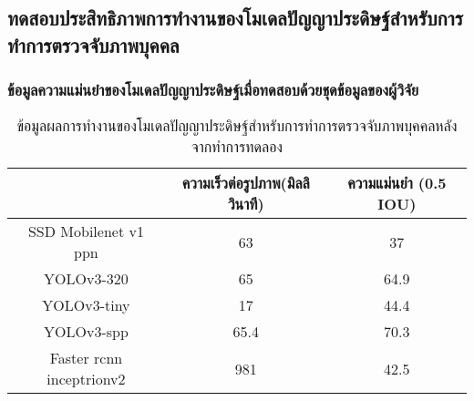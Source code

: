 \subsection{ทดสอบประสิทธิภาพการทำงานของโมเดลปัญญาประดิษฐ์สำหรับการทำการตรวจจับภาพบุคคล}
\subsubsection*{ข้อมูลความแม่นยำของโมเดลปัญญาประดิษฐ์เมื่อทดสอบด้วยชุดข้อมูลของผู้วิจัย}
\begin{table}[!ht]
	\centering
	\begin{tabular}{|c|c|c|}
			\hline 
			{}&{ความเร็วต่อรูปภาพ(มิลลิวินาที)}&{ความแม่นยำ (0.5 IOU)}			\\
			\hline
			SSD Mobilenet v1 ppn	 					& 63 			& 37			\\
			YOLOv3-320							& 65			& 64.9		\\
			YOLOv3-tiny							& 17			& 44.4			\\
			YOLOv3-spp							& 65.4			& 70.3			\\	
			Faster rcnn inceptrionv2					& 981		& 42.5		\\
		\hline
	\end{tabular}
	\caption{ข้อมูลผลการทำงานของโมเดลปัญญาประดิษฐ์สำหรับการทำการตรวจจับภาพบุคคลหลังจากทำการทดลอง}
    \label{tab:origina_detectEx}
\end{table}
